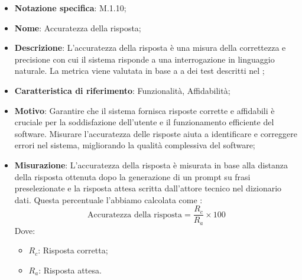 \begin{itemize}
    \item \textbf{Notazione specifica}: M.1.10;
    \item \textbf{Nome}: Accuratezza della risposta;
    \item \textbf{Descrizione}: L'accuratezza della risposta è una misura della correttezza e precisione con cui il sistema risponde a una interrogazione in linguaggio naturale. La metrica viene valutata in base a a dei test descritti nel ;
    \item \textbf{Caratteristica di riferimento}: Funzionalità, Affidabilità;
    \item \textbf{Motivo}: Garantire che il sistema fornisca risposte corrette e affidabili è cruciale per la soddisfazione dell'utente e il funzionamento efficiente del software. Misurare l'accuratezza delle risposte aiuta a identificare e correggere errori nel sistema, migliorando la qualità complessiva del software;
    \item \textbf{Misurazione}: L'accuratezza della risposta è misurata in base alla distanza della risposta ottenuta dopo la generazione di un prompt su frasi preselezionate e la risposta attesa scritta dall'attore tecnico nel dizionario dati. Questa percentuale l'abbiamo calcolata come :
    \[
    \text{Accuratezza della risposta} = \frac{R_{c}}{R_{a}} \times 100
    \]
    Dove:
    \begin{itemize}
        \item $R_{c}$: Risposta corretta;
        \item $R_{a}$: Risposta attesa.
    \end{itemize}
 \end{itemize}
